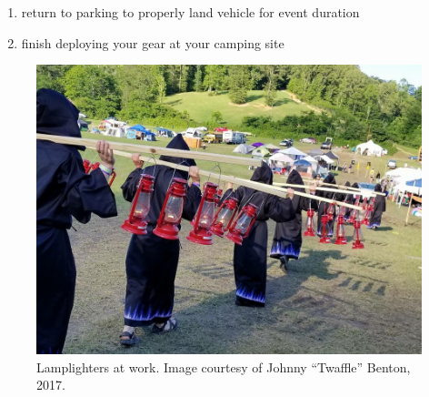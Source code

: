 \begin{enumerate}[noitemsep]
\begin{itemize}
\begin{itemize}
             \end{itemize}
      \end{itemize}
    \item return to \gls{parking} to properly land vehicle for event duration
    \item finish deploying your gear at your camping site
\end{enumerate}

\vfill
\begin{figure}[H]
\includegraphics[width=\textwidth]{images/lamplighters.jpeg}
\caption{Lamplighters at work. Image courtesy of Johnny “Twaffle” Benton, 2017.}
\label{fig:lamplighters2017}
\end{figure}






